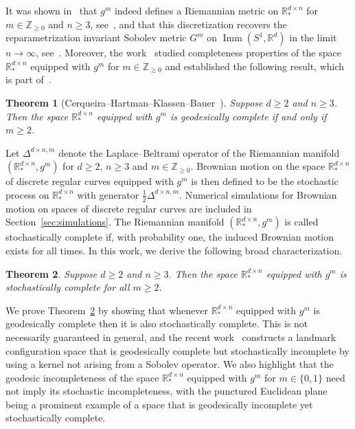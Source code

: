 \documentclass[11pt]{article}
\newtheorem{thm}{Theorem}
\newcommand{\R}{\mathbb{R}}
\newcommand{\Z}{\mathbb{Z}}
\begin{document}
It was shown in~\cite{cerqueira2024sobolevmetricsspacesdiscrete} that $g^m$ indeed defines a Riemannian metric on $\R_*^{d\times n}$ for $m\in\Z_{\geq 0}$ and $n\geq 3$, see~\cite[Lemma 3.4]{cerqueira2024sobolevmetricsspacesdiscrete}, and that this discretization recovers the reparametrization invariant Sobolev metric $G^m$ on $\operatorname{Imm}(S^1,\R^d)$ in the limit $n\to\infty$, see~\cite[Proposition 3.7]{cerqueira2024sobolevmetricsspacesdiscrete}. Moreover, the work~\cite{cerqueira2024sobolevmetricsspacesdiscrete} studied completeness properties of the space $\R_*^{d\times n}$ equipped with $g^m$ for $m\in\Z_{\geq 0}$ and established the following result, which is part of~\cite[Theorem 4.1]{cerqueira2024sobolevmetricsspacesdiscrete}.
\begin{thm}[Cerqueira--Hartman--Klassen--Bauer~\cite{cerqueira2024sobolevmetricsspacesdiscrete}]\label{thm:geocomplete}
    Suppose $d\geq 2$ and $n\geq 3$. Then the space $\R_*^{d\times n}$ equipped with $g^m$ is geodesically complete if and only if $m\geq 2$.
\end{thm}

Let $\Delta^{d\times n,m}$ denote the Laplace--Beltrami operator of the Riemannian manifold $(\R_*^{d\times n},g^m)$ for $d\geq 2$, $n\geq 3$ and $m\in\Z_{\geq 0}$. Brownian motion on the space $\R_*^{d\times n}$ of discrete regular curves equipped with $g^m$ is then defined to be the stochastic process on $\R_*^{d\times n}$ with generator $\frac{1}{2}\Delta^{d\times n,m}$. Numerical simulations for Brownian motion on spaces of discrete regular curves are included in Section~\ref{sec:simulations}. The Riemannian manifold $(\R_*^{d\times n},g^m)$ is called stochastically complete if, with probability one, the induced Brownian motion exists for all times. In this work, we derive the following broad characterization.
\begin{thm}\label{thm:stocomplete}
    Suppose $d\geq 2$ and $n\geq 3$. Then the space $\R_*^{d\times n}$ equipped with $g^m$ is stochastically complete for all $m\geq 2$.
\end{thm}

We prove Theorem~\ref{thm:stocomplete} by showing that whenever $\R_*^{d\times n}$ equipped with $g^m$ is geodesically complete then it is also stochastically complete. This is not necessarily guaranteed in general, and the recent work~\cite{HPS} constructs a landmark configuration space that is geodesically complete but stochastically incomplete by using a kernel not arising from a Sobolev operator. We also highlight that the geodesic incompleteness of the space $\R_*^{d\times n}$ equipped with $g^m$ for $m\in\{0,1\}$ need not imply its stochastic incompleteness, with the punctured Euclidean plane being a prominent example of a space that is geodesically incomplete yet stochastically complete.
\end{document}
